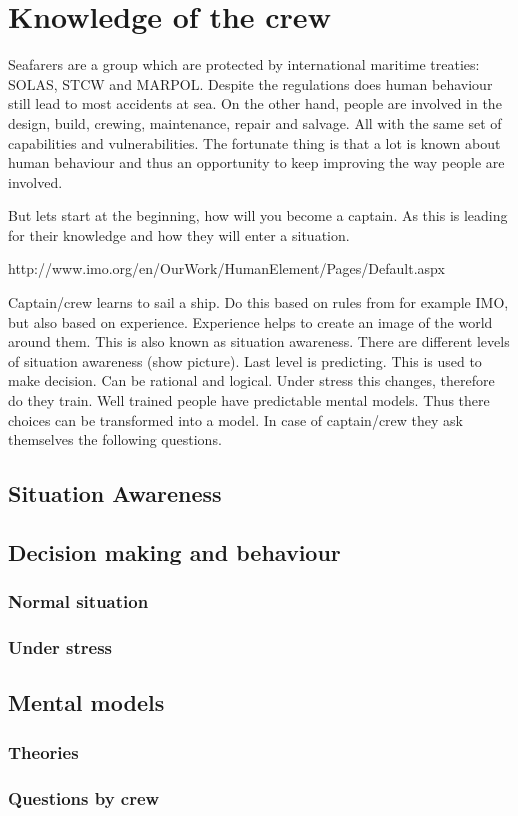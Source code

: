 \section{Knowledge of the crew}
Seafarers are a group which are protected by international maritime treaties: \ac{SOLAS}, \ac{STCW} and \ac{MARPOL}. Despite the regulations does human behaviour still lead to most accidents at sea. On the other hand, people are involved in the design, build, crewing, maintenance, repair and salvage. All with the same set of capabilities and vulnerabilities. The fortunate thing is that a lot is known about human behaviour and thus an opportunity to keep improving the way people are involved.

But lets start at the beginning, how will you become a captain. As this is leading for their knowledge and how they will enter a situation. 

http://www.imo.org/en/OurWork/HumanElement/Pages/Default.aspx

 
Captain/crew learns to sail a ship. 
Do this based on rules from for example IMO, but also based on experience. 
Experience helps to create an image of the world around them. 
This is also known as situation awareness. 
There are different levels of situation awareness (show picture). 
Last level is predicting. This is used to make decision. Can be rational and logical. Under stress this changes, therefore do they train.
Well trained people have predictable mental models. Thus there choices can be transformed into a model.
In case of captain/crew they ask themselves the following questions.

\subsection{Situation Awareness}

\subsection{Decision making and behaviour}

\subsubsection{Normal situation}

\subsubsection{Under stress}

\subsection{Mental models}

\subsubsection{Theories}

\subsubsection{Questions by crew}